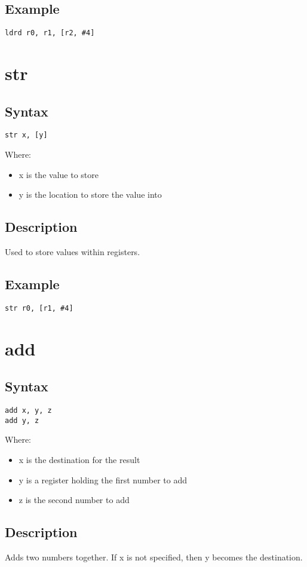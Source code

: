 \documentclass[11pt]{scrartcl}
\begin{document}
\subsection{Example}
\begin{verbatim}
ldrd r0, r1, [r2, #4]
\end{verbatim}

\section{str}
\subsection{Syntax}
\begin{verbatim}
str x, [y]
\end{verbatim}
Where:
\begin{itemize}
    \item x is the value to store
    \item y is the location to store the value into
\end{itemize}
\subsection{Description}
Used to store values within registers.
\subsection{Example}
\begin{verbatim}
str r0, [r1, #4]
\end{verbatim}

\section{add}
\subsection{Syntax}
\begin{verbatim}
add x, y, z
add y, z
\end{verbatim}
Where:
\begin{itemize}
    \item x is the destination for the result
    \item y is a register holding the first number to add
    \item z is the second number to add
\end{itemize}
\subsection{Description}
Adds two numbers together. If x is not specified, then y becomes the destination.
\end{document}
